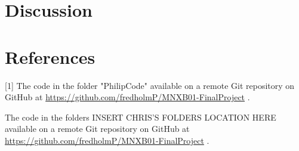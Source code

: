 \documentclass[a4, 12pt]{article}
\begin{document}






\section{Discussion}

\newpage
\section{References}
[1] The code in the folder "PhilipCode" available on a remote Git repository on GitHub at \href{https://github.com/fredholmP/MNXB01-FinalProject}{https://github.com/fredholmP/MNXB01-FinalProject} . \newline

\noindent [2] The code in the folders INSERT CHRIS'S FOLDERS LOCATION HERE available on a remote Git repository on GitHub at \href{https://github.com/fredholmP/MNXB01-FinalProject}{https://github.com/fredholmP/MNXB01-FinalProject} . \newline
\end{document}
